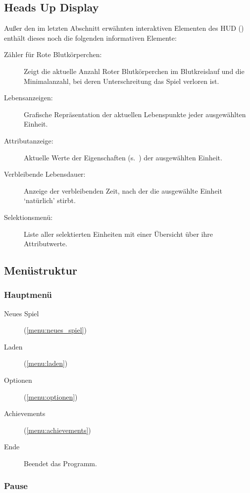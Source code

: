 \subsection{Heads Up Display}

Außer den im letzten Abschnitt erwähnten interaktiven Elementen des HUD
() enthält dieses noch die folgenden informativen Elemente:

\begin{description}
  \item[Zähler für Rote Blutkörperchen:] Zeigt die aktuelle Anzahl Roter
    Blutkörperchen im Blutkreislauf und die Minimalanzahl, bei deren
    Unterschreitung das Spiel verloren ist.
  \item[Lebensanzeigen:] Grafische Repräsentation der aktuellen Lebenspunkte
    jeder ausgewählten Einheit.
  \item[Attributanzeige:] Aktuelle Werte der Eigenschaften
    (s.~) der ausgewählten Einheit.
  \item[Verbleibende Lebensdauer:] Anzeige der verbleibenden Zeit, nach der die
    ausgewählte Einheit \enquote*{natürlich} stirbt.
  \item[Selektionsmenü:] Liste aller selektierten Einheiten mit einer
    Übersicht über ihre Attributwerte.
\end{description}

\subsection{Menüstruktur}

\subsubsection{Hauptmenü}
\label{menu:hauptmenu}

\begin{description}
  \item[Neues Spiel] (\ref{menu:neues_spiel})
  \item[Laden] (\ref{menu:laden})
  \item[Optionen] (\ref{menu:optionen})
  \item[Achievements] (\ref{menu:achievements})
  \item[Ende] Beendet das Programm.
\end{description}

\subsubsection{Pause}
\label{menu:pause}

